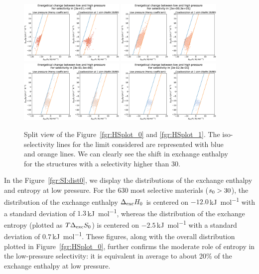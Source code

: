 \documentclass[main.tex]{subfiles}
\begin{document}
  \begin{figure}[h]
    \centering
      \includegraphics[width=0.45\textwidth]{figures/2-thermo/H_S_0.jpg}
      \includegraphics[width=0.45\textwidth]{figures/2-thermo/H_S_1.jpg}
      \includegraphics[width=0.45\textwidth]{figures/2-thermo/H_S_2.jpg}
      \includegraphics[width=0.45\textwidth]{figures/2-thermo/H_S_3.jpg}
      \caption{Split view of the Figure~\ref{fgr:HSplot_0} and \ref{fgr:HSplot_1}. The iso-selectivity lines for the limit considered are represented with blue and orange lines. We can clearly see the shift in exchange enthalpy for the structures with a selectivity higher than $30$.}
      \label{fgr:SI:dist1}
    \end{figure}
  
  
  In the Figure~\ref{fgr:SI:dist0}, we display the distributions of the exchange enthalpy and entropy at low pressure. For the 630 most selective materials ($s_{\text{0}} > 30$), the distribution of the exchange enthalpy $\Delta_{\text{exc}}H_{\text{0}}$ is centered on $-12.0$\,\si{\kilo\joule\per\mol} with a standard deviation of $1.3$\,\si{\kilo\joule\per\mol}, whereas the distribution of the exchange entropy (plotted as $T\Delta_{\text{exc}}S_{\text{0}}$) is centered on $-2.5$\,\si{\kilo\joule\per\mol} with a standard deviation of $0.7$\,\si{\kilo\joule\per\mol}. These figures, along with the overall distribution plotted in Figure~\ref{fgr:HSplot_0}, further confirms the moderate role of entropy in the low-pressure selectivity: it is equivalent in average to about {20\%} of the exchange enthalpy at low pressure.
  
\end{document}
